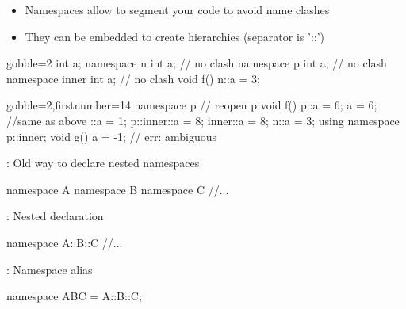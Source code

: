 \begin{frame}[fragile]
\begin{multicols}{2}

  \end{multicols}
\end{frame}

\begin{frame}[fragile]
  \begin{itemize}
  \item Namespaces allow to segment your code to avoid name clashes
  \item They can be embedded to create hierarchies (separator is '::')
  \end{itemize}
  \begin{multicols}{2}
    \begin{cppcode*}{gobble=2}
      int a;
      namespace n {
        int a;   // no clash
      }
      namespace p {
        int a;   // no clash
        namespace inner {
          int a; // no clash
        }
      }
      void f() {
        n::a = 3;
      }
    \end{cppcode*}
    \columnbreak
    \begin{cppcode*}{gobble=2,firstnumber=14}
      namespace p { // reopen p
        void f() {
          p::a = 6;
          a = 6;  //same as above
          ::a = 1;
          p::inner::a = 8;
          inner::a = 8;
          n::a = 3;
        }
      }
      using namespace p::inner;
      void g() {
        a = -1; // err: ambiguous
      }
  \end{cppcode*}
  \end{multicols}
\end{frame}

\begin{frame}[fragile]
  \begin{alertblock}{: Old way to declare nested namespaces}
    \begin{cppcode*}{}
      namespace A {
        namespace B {
          namespace C {
            //...
          }
        }
      }
    \end{cppcode*}
  \end{alertblock}
  \begin{exampleblock}{: Nested declaration}
    \begin{cppcode*}{}
      namespace A::B::C {
        //...
      }
    \end{cppcode*}
  \end{exampleblock}
  \begin{exampleblock}{: Namespace alias}
    \begin{cppcode*}{}
      namespace ABC = A::B::C;
    \end{cppcode*}
  \end{exampleblock}
\end{frame}

